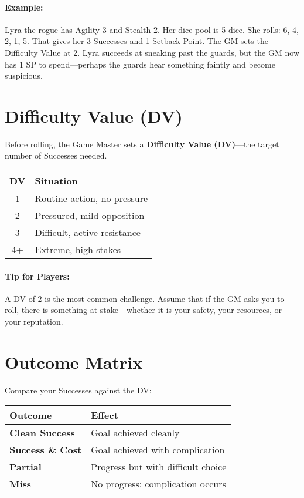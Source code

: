 \begin{multicols}{2}
\paragraph{Example:}  
Lyra the rogue has Agility 3 and Stealth 2. Her dice pool is 5 dice. She rolls: 6, 4, 2, 1, 5. That gives her 3 Successes and 1 Setback Point. The GM sets the Difficulty Value at 2. Lyra succeeds at sneaking past the guards, but the GM now has 1 SP to spend—perhaps the guards hear something faintly and become suspicious.

\section{Difficulty Value (DV)} 

Before rolling, the Game Master sets a \textbf{Difficulty Value (DV)}—the target number of Successes needed.

\begin{center}
\small
\begin{tabular}{cl}
\toprule
\textbf{DV} & \textbf{Situation} \\
\midrule
1 & Routine action, no pressure \\
2 & Pressured, mild opposition \\
3 & Difficult, active resistance \\
4+ & Extreme, high stakes \\
\bottomrule
\end{tabular}
\end{center}

\paragraph{Tip for Players:} A DV of 2 is the most common challenge. Assume that if the GM asks you to roll, there is something at stake—whether it is your safety, your resources, or your reputation.

\section{Outcome Matrix} 

Compare your Successes against the DV:

\begin{center}
\small
\begin{tabular}{ll}
\toprule
\textbf{Outcome} & \textbf{Effect} \\
\midrule
\textbf{Clean Success}\index{Success!Clean} & Goal achieved cleanly \\
\textbf{Success \& Cost}\index{Success!with Cost} & Goal achieved with complication \\
\textbf{Partial}\index{Partial} & Progress but with difficult choice \\
\textbf{Miss}\index{Miss} & No progress; complication occurs \\
\bottomrule
\end{tabular}
\end{center}


\end{multicols}
